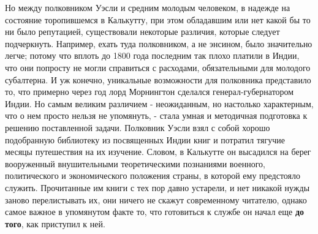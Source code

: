 \documentclass[
  oneside,
  12pt,
  titlepage]{book}
\begin{document}
Но между полковником Уэсли и средним молодым человеком, в надежде на состояние торопившемся в Калькутту, при этом обладавшим или нет какой бы то ни было репутацией, существовали некоторые различия, которые следует подчеркнуть. Например, ехать туда полковником, а не энсином, было значительно легче; потому что вплоть до 1800 года последним так плохо платили в Индии, что они попросту не могли справиться с расходами, обязательными для молодого субалтерна. И уж конечно, уникальные возможности для полковника представило то, что примерно через год лорд Морнингтон сделался генерал-губернатором Индии. Но самым великим различием - неожиданным, но настолько характерным, что о нем просто нельзя не упомянуть, - стала умная и методичная подготовка к решению поставленной задачи. Полковник Уэсли взял с собой хорошо подобранную библиотеку из посвященных Индии книг и потратил тягучие месяцы путешествия на их изучение. Словом, в Калькутте он высадился на берег вооруженный внушительными теоретическими познаниями военного, политического и экономического положения страны, в которой ему предстояло служить. Прочитанные им книги с тех пор давно устарели, и нет никакой нужды заново перелистывать их, они ничего не скажут современному читателю, однако самое важное в упомянутом факте то, что готовиться к службе он начал еще \textbf{до того}, как приступил к ней.
\end{document}
